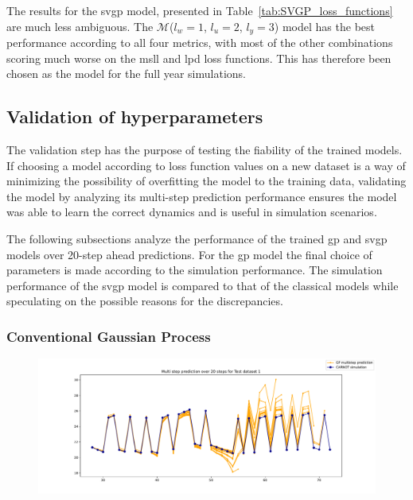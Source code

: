 The results for the \acrshort{svgp} model, presented in
Table~\ref{tab:SVGP_loss_functions} are much less ambiguous. The
$\mathcal{M}$($l_w = 1$, $l_u = 2$, $l_y = 3$) model has the best performance
according to all four metrics, with most of the other combinations scoring much
worse on the \acrshort{msll} and \acrshort{lpd} loss functions. This has
therefore been chosen as the model for the full year simulations.


\subsection{Validation of hyperparameters}


The validation step has the purpose of testing the fiability of the trained
models. If choosing a model according to loss function values on a new dataset
is a way of minimizing the possibility of overfitting the model to the training
data, validating the model by analyzing its multi-step prediction performance
ensures the model was able to learn the correct dynamics and is useful in
simulation scenarios.

The following subsections analyze the performance of the trained \acrshort{gp}
and \acrshort{svgp} models over 20-step ahead predictions. For the \acrshort{gp}
model the final choice of parameters is made according to the simulation
performance. The simulation performance of the \acrshort{svgp} model is compared
to that of the classical models while speculating on the possible reasons for
the discrepancies.

\subsubsection{Conventional Gaussian Process}


\begin{figure}[ht]
    \centering
    \includegraphics[width =
    \textwidth]{Plots/GP_113_-1pts_test_prediction_20_steps.pdf}
    \caption{}
    \label{fig:GP_multistep_validation}
\end{figure}

